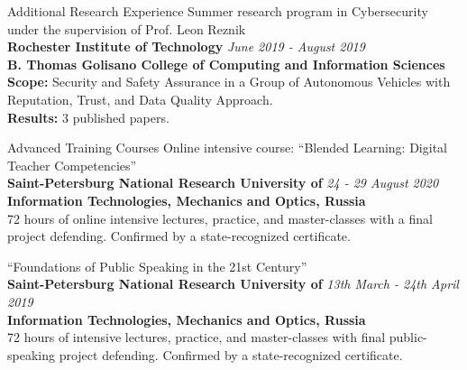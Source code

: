 \documentclass[10pt]{resume} %
\begin{document}
\begin{rSection}{Additional Research Experience}
Summer research program in Cybersecurity under the supervision of Prof. Leon Reznik\\
{\bf Rochester Institute of Technology} \hfill {\em June 2019 - August 2019}\\ \textbf{B. Thomas Golisano College of Computing and Information Sciences}\\
\textbf{Scope:} Security and Safety Assurance in a Group of Autonomous Vehicles with Reputation, Trust, and Data Quality Approach.\\
\textbf{Results:} 3 published papers.
\end{rSection}

\begin{rSection}{Advanced Training Courses}
Online intensive course: ``Blended Learning: Digital Teacher Competencies''\\
{\bf Saint-Petersburg National Research University of} \hfill {\em 24 - 29 August 2020}\\ \textbf{Information Technologies, Mechanics and Optics, Russia} \hfill \\
72 hours of online intensive lectures, practice, and master-classes with a final project defending. Confirmed by a state-recognized certificate.

``Foundations of Public Speaking in the 21st Century''\\
{\bf Saint-Petersburg National Research University of} \hfill {\em 13th March - 24th April 2019}\\ \textbf{Information Technologies, Mechanics and Optics, Russia} \hfill \\
72 hours of intensive lectures, practice, and master-classes with final public-speaking project defending. Confirmed by a state-recognized certificate.
\end{rSection}
\end{document}
